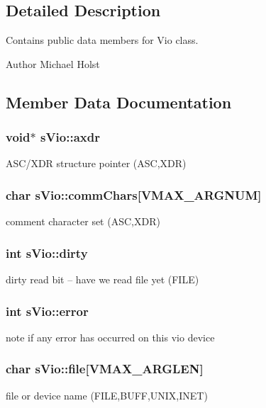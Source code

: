\subsection{Detailed Description}
Contains public data members for Vio class. 

\begin{DoxyAuthor}{Author}
Michael Holst 
\end{DoxyAuthor}


\subsection{Member Data Documentation}
\subsubsection[{axdr}]{\setlength{\rightskip}{0pt plus 5cm}void$\ast$ s\-Vio\-::axdr}\label{a00002_acdd32890033cf340b8749afe256647f9}
A\-S\-C/\-X\-D\-R structure pointer (A\-S\-C,X\-D\-R) 
\subsubsection[{comm\-Chars}]{\setlength{\rightskip}{0pt plus 5cm}char s\-Vio\-::comm\-Chars[{\bf V\-M\-A\-X\-\_\-\-A\-R\-G\-N\-U\-M}]}\label{a00002_a58c30e0df43f9853024a3d617f62ee33}
comment character set (A\-S\-C,X\-D\-R) 
\subsubsection[{dirty}]{\setlength{\rightskip}{0pt plus 5cm}int s\-Vio\-::dirty}\label{a00002_a72fb31f8402b0529548f19d2fef80dc6}
dirty read bit -- have we read file yet (F\-I\-L\-E) 
\subsubsection[{error}]{\setlength{\rightskip}{0pt plus 5cm}int s\-Vio\-::error}\label{a00002_af77cb7bb4dafab6b485a881732e7b8f9}
note if any error has occurred on this vio device 
\subsubsection[{file}]{\setlength{\rightskip}{0pt plus 5cm}char s\-Vio\-::file[{\bf V\-M\-A\-X\-\_\-\-A\-R\-G\-L\-E\-N}]}\label{a00002_ab8b3817815f2c248fb0e781944a43b17}
file or device name (F\-I\-L\-E,B\-U\-F\-F,U\-N\-I\-X,I\-N\-E\-T) 
